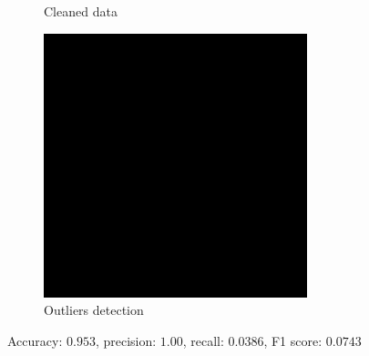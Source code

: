 \documentclass{beamer}
\theoremstyle{plain}
\theoremstyle{definition}
\theoremstyle{remark}
\begin{document}
\begin{frame}
\begin{figure}
\begin{subfigure}[b]{0.3\textwidth}
			\caption{Cleaned data}
		\end{subfigure}
		\hfill
		\begin{subfigure}[b]{0.3\textwidth}
			\centering
			\includegraphics[width=\textwidth]{Images/l21S_8.png}
			\caption{Outliers detection}
		\end{subfigure}
		   \caption{Accuracy: $0.953$, precision: $1.00$, recall: $0.0386$, F1 score: $0.0743$}
   \end{figure}
\end{frame}
\end{document}
